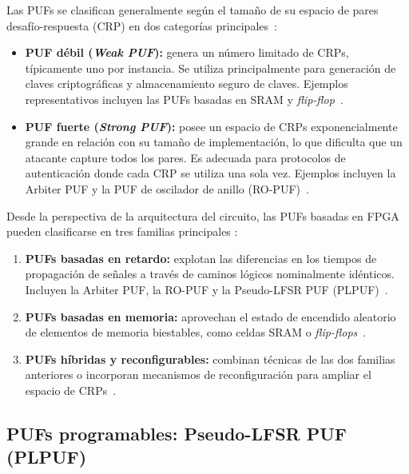 Las PUFs se clasifican generalmente según el tamaño de su espacio de pares
desafío-respuesta (CRP) en dos categorías
principales~\cite{shamsoshoara_2020_puf, lata_2023_fpgapuf}:

\begin{itemize}
  \item \textbf{PUF débil (\textit{Weak PUF}):} genera un número limitado de
    CRPs, típicamente uno por instancia. Se utiliza principalmente para
    generación de claves criptográficas y almacenamiento seguro de claves.
    Ejemplos representativos incluyen las PUFs basadas en SRAM y
    \textit{flip-flop}~\cite{lata_2023_fpgapuf, chen_2016_fpga}.
  \item \textbf{PUF fuerte (\textit{Strong PUF}):} posee un espacio de CRPs
    exponencialmente grande en relación con su tamaño de implementación, lo
    que dificulta que un atacante capture todos los pares. Es adecuada para
    protocolos de autenticación donde cada CRP se utiliza una sola vez.
    Ejemplos incluyen la Arbiter PUF y la PUF de oscilador de anillo
    (RO-PUF)~\cite{shamsoshoara_2020_puf, lata_2023_fpgapuf}.
\end{itemize}

Desde la perspectiva de la arquitectura del circuito, las PUFs basadas en
FPGA pueden clasificarse en tres familias principales
\cite{lata_2023_fpgapuf, anandakumar_2021_fpgapufs}:

\begin{enumerate}
  \item \textbf{PUFs basadas en retardo:} explotan las diferencias en los
    tiempos de propagación de señales a través de caminos lógicos nominalmente
    idénticos. Incluyen la Arbiter PUF, la RO-PUF y la
    Pseudo-LFSR PUF (PLPUF)~\cite{hori_2011_pseudolfsr}.
  \item \textbf{PUFs basadas en memoria:} aprovechan el estado de
    encendido aleatorio de elementos de memoria biestables, como celdas SRAM
    o \textit{flip-flops}~\cite{chen_2016_fpga}.
  \item \textbf{PUFs híbridas y reconfigurables:} combinan técnicas de las
    dos familias anteriores o incorporan mecanismos de reconfiguración para
    ampliar el espacio de CRPs~\cite{liu_2019_xor}.
\end{enumerate}


\subsection{PUFs programables: Pseudo-LFSR PUF (PLPUF)}
\label{sec:plpuf}

